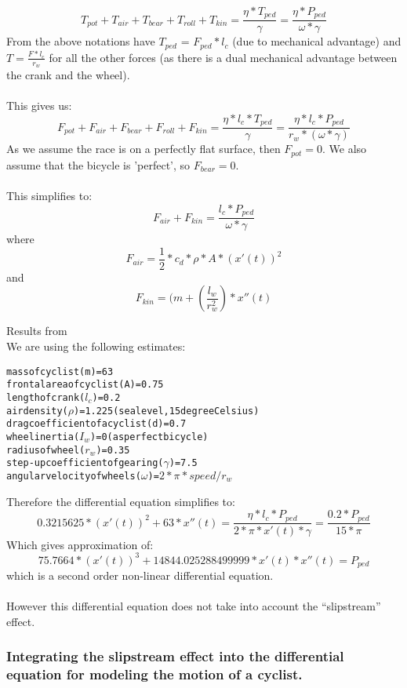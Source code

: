 \documentclass[10pt, a4paper]{report}
\begin{document}
$$ T_{pot} + T_{air} + T_{bear} + T_{roll} + T_{kin} = \frac{ \eta * T_{ped} }{ \gamma }  = \frac{\eta * P_{ped}}{\omega * \gamma} $$
From the above notations have $T_{ped}$ = $F_{ped} * l_{c}$ (due to mechanical advantage) and $T = \frac{F * l_{c}}{r_{w}}$ for all the other forces (as there is a dual mechanical advantage between the crank and the wheel).\\\\
This gives us: $$ F_{pot} + F_{air} + F_{bear} + F_{roll} + F_{kin}
	= \frac{ \eta * l_{c} * T_{ped} }{ \gamma }
	= \frac{ \eta * l_{c} * P_{ped} }{ r_{w} * (\omega * \gamma)} $$
As we assume the race is on a perfectly flat surface, then $F_{pot} = 0$. We also assume that the bicycle is 'perfect', so $F_{bear} = 0$. \\\\
This simplifies to: $$F_{air} + F_{kin} = \frac{l_{c} * P_{ped} }{ \omega * \gamma } $$
where $$ F_{air} 	= \frac{1}{2} * c_{d} * \rho * A * ( x'(t) )^{2} $$
and	  $$ F_{kin} 	= ( m + ( \frac{l_w}{r_w^{2}} ) * x''(t) $$

Results from \cite{MathModel}\\
We are using the following estimates:

\begin{alltt}
mass of cyclist (m) 				= 63
frontal area of cyclist (A) 		= 0.75
length of crank (\(l_{c}\)) 		= 0.2
air density (\(\rho\)) 				= 1.225 (sea level, 15 degree Celsius)
drag coefficient of a cyclist (d) 	= 0.7
wheel inertia (\(I_w\)) = 0 (as perfect bicycle)
radius of wheel (\(r_w\)) = 0.35
step-up coefficient of gearing (\(\gamma\)) = 7.5
angular velocity of wheels (\(\omega\)) = \(2 * \pi * speed / {r_{w}} \)
\end{alltt}
Therefore the differential equation simplifies to:
$$ 0.3215625 * (x'(t))^{2} + 63 * x''(t)
	= \frac{\eta * l_{c} * P_{ped}} {2 * \pi * x'(t) * \gamma }
	= \frac {0.2 * P_{ped}} {15 * \pi} $$
Which gives approximation of:
$$ 75.7664 *(x'(t))^{3} + 14844.025288499999 * x'(t) * x''(t) = P_{ped}$$
which is a second order non-linear differential equation.\\\\
However this differential equation does not take into account the ``slipstream'' effect.

\subsubsection{Integrating the slipstream effect into the differential equation for modeling the motion of a cyclist.}
\end{document}
